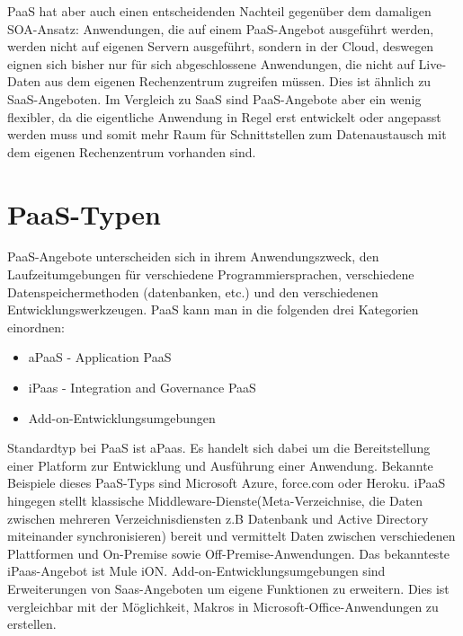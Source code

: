 \documentclass[a4paper,10pt]{article}
\begin{document}
\vspace{3mm}
PaaS hat aber auch einen entscheidenden Nachteil gegenüber dem damaligen SOA-Ansatz: Anwendungen, die auf einem PaaS-Angebot ausgeführt werden, werden nicht auf eigenen Servern ausgeführt, sondern in der Cloud, deswegen eignen sich bisher nur für sich abgeschlossene Anwendungen, die nicht auf Live-Daten aus dem eigenen Rechenzentrum zugreifen müssen. Dies ist ähnlich zu SaaS-Angeboten. Im Vergleich zu SaaS sind PaaS-Angebote aber ein wenig flexibler, da die eigentliche Anwendung in Regel erst entwickelt oder angepasst werden muss und somit mehr Raum für Schnittstellen zum Datenaustausch mit dem eigenen Rechenzentrum vorhanden sind.

\section{PaaS-Typen}
PaaS-Angebote unterscheiden sich in ihrem Anwendungszweck, den Laufzeitumgebungen für verschiedene Programmiersprachen, verschiedene Datenspeichermethoden (datenbanken, etc.) und den verschiedenen Entwicklungswerkzeugen. PaaS kann man in die folgenden drei Kategorien einordnen:
\begin{itemize}
	\item aPaaS - Application PaaS
	\item iPaas - Integration and Governance PaaS
	\item Add-on-Entwicklungsumgebungen
\end{itemize}
Standardtyp bei PaaS ist aPaas. Es handelt sich dabei um die Bereitstellung einer Platform zur Entwicklung und Ausführung einer Anwendung. Bekannte Beispiele dieses PaaS-Typs sind Microsoft Azure, force.com oder Heroku. iPaaS hingegen stellt klassische Middleware-Dienste(Meta-Verzeichnise, die Daten zwischen mehreren Verzeichnisdiensten z.B Datenbank und Active Directory miteinander synchronisieren) bereit und vermittelt Daten zwischen verschiedenen Plattformen und On-Premise sowie Off-Premise-Anwendungen. Das bekannteste iPaas-Angebot ist Mule iON. Add-on-Entwicklungsumgebungen sind Erweiterungen von Saas-Angeboten um eigene Funktionen zu erweitern. Dies ist vergleichbar mit der Möglichkeit, Makros in Microsoft-Office-Anwendungen zu erstellen.
\end{document}

